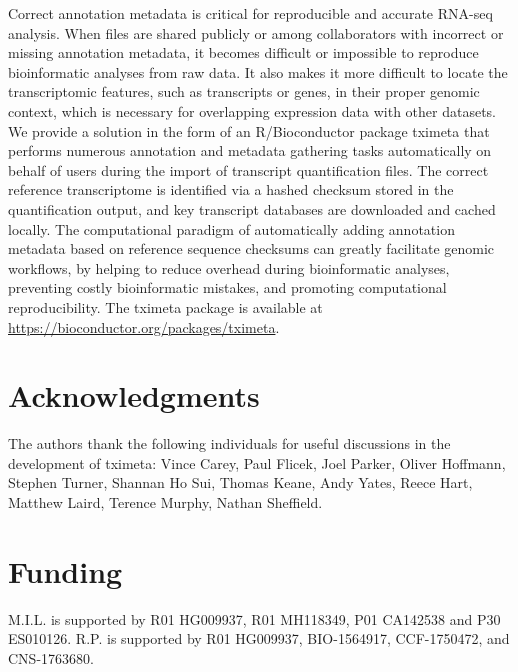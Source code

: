 \documentclass[10pt,letterpaper]{article}
\begin{document}
Correct annotation metadata is critical for reproducible and accurate
RNA-seq analysis. When files are shared publicly or among
collaborators with incorrect or missing annotation metadata, it
becomes difficult or impossible to reproduce bioinformatic analyses
from raw data. It also makes it more difficult to locate the
transcriptomic features, such as transcripts or genes, in their proper
genomic context, which is necessary for overlapping expression data
with other datasets. We provide a solution in the form of an
R/Bioconductor package tximeta that performs numerous annotation and
metadata gathering tasks automatically on behalf of users during the
import of transcript quantification files. The correct reference
transcriptome is identified via a hashed checksum stored in the
quantification output, and key transcript databases are downloaded and
cached locally. The computational paradigm of automatically adding
annotation metadata based on reference sequence checksums can greatly
facilitate genomic workflows, by helping to reduce overhead during
bioinformatic analyses, preventing costly bioinformatic mistakes, and
promoting computational reproducibility.
The tximeta package is
available at \url{https://bioconductor.org/packages/tximeta}.

\linenumbers



\section*{Acknowledgments}

The authors thank the following individuals for useful discussions 
in the development of tximeta: Vince Carey, Paul Flicek, Joel Parker,
Oliver Hoffmann, Stephen Turner, Shannan Ho Sui, Thomas Keane, Andy
Yates, Reece Hart, Matthew Laird, Terence Murphy, Nathan Sheffield.

\section*{Funding}

M.I.L. is supported by R01 HG009937, R01 MH118349, P01 CA142538 and
P30 ES010126.
R.P. is supported by R01 HG009937, BIO-1564917, CCF-1750472, and
CNS-1763680. 

\nolinenumbers


\end{document}

